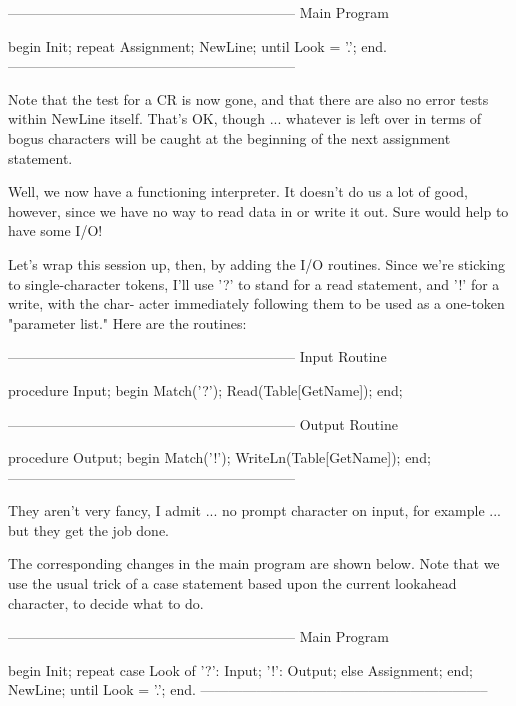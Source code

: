 \documentclass[float=false, crop=false]{standalone}
\begin{document}
\begin{code}
{--------------------------------------------------------------}
{ Main Program }

begin
   Init;
   repeat
      Assignment;
      NewLine;
   until Look = '.';
end.
{--------------------------------------------------------------}
\end{code}

Note that the test for a CR is now gone, and that there are also no error tests
within NewLine itself. That's OK, though ... whatever is left over in terms of
bogus characters will be caught at the beginning of the next assignment
statement.

Well, we now have a functioning interpreter. It doesn't do us a lot of good,
however, since we have no way to read data in or write it out. Sure would help
to have some I/O!

Let's wrap this session up, then, by adding the I/O routines. Since we're
sticking to single-character tokens, I'll use '?' to stand for a read statement,
and '!' for a write, with the char- acter immediately following them to be used
as a one-token "parameter list." Here are the routines:

\begin{code}
{--------------------------------------------------------------}
{ Input Routine }

procedure Input;
begin
   Match('?');
   Read(Table[GetName]);
end;


{--------------------------------------------------------------}
{ Output Routine }

procedure Output;
begin
   Match('!');
   WriteLn(Table[GetName]);
end;
{--------------------------------------------------------------}
\end{code}

They aren't very fancy, I admit ... no prompt character on input, for example
... but they get the job done.

The corresponding changes in the main program are shown below. Note that we use
the usual trick of a case statement based upon the current lookahead character,
to decide what to do.

\begin{code}
{--------------------------------------------------------------}
{ Main Program }

begin
   Init;
   repeat
      case Look of
       '?': Input;
       '!': Output;
       else Assignment;
      end;
      NewLine;
   until Look = '.';
end.
{--------------------------------------------------------------}
\end{code}
\end{document}
